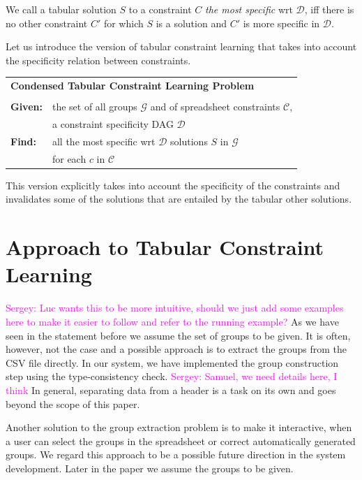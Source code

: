 \documentclass{ecai}
\newcommand{\sergey}[1]{\textcolor{magenta}{{\sc Sergey:} #1}\xspace}
\newcommand{\constraints}{\ensuremath{\mathcal{C}}\xspace}
\newcommand{\dependencies}{\ensuremath{\mathcal{D}}\xspace}
\newcommand{\groups}{\ensuremath{\mathcal{G}}\xspace}
\begin{document}
We call a tabular solution $S$ to a constraint $C$ \textit{the most specific} wrt \dependencies, iff there is no other constraint $C'$ for which $S$ is a solution and $C'$ is more specific in \dependencies.


Let us introduce the version of tabular constraint learning that takes into account the specificity relation between constraints.

\begin{minipage}[c]{14em}
  \vspace{5pt}
  \begin{tabular}{ll}
    \multicolumn{2}{l}{{\textbf{Condensed Tabular Constraint Learning Problem}}}\\
    \vspace{-4pt}
    &\\
    \textbf{Given:}& the set of all groups $\groups$ and of spreadsheet constraints $\constraints$,\\
    & a constraint specificity DAG \dependencies \\
    \textbf{Find:}& all the most specific wrt \dependencies solutions $S$ in \groups\\
    & for each $c$ in \constraints \\
  \end{tabular}
  \vspace{6pt}
\end{minipage}

This version explicitly takes into account the specificity of the constraints and invalidates some of the solutions that are entailed by the tabular other solutions.

\section{Approach to Tabular Constraint Learning}
\sergey{Luc wants this to be more intuitive, should we just add some examples here to make it easier to follow and refer to the running example?}
As we have seen in the statement before we assume the set of groups to be given. It is often, however, not the case and a possible approach is to extract the groups from the CSV file directly. In our system, we have implemented the group construction step using the type-consistency check. \sergey{Samuel, we need details here, I think} In general, separating data from a header is a task on its own  \cite{header} and goes beyond the scope of this paper.

Another solution to the group extraction problem is to make it interactive, when a user can select the groups in the spreadsheet or correct automatically generated groups. We regard this approach to be a possible future direction in the system development. Later in the paper we assume the groups to be given.
\end{document}
